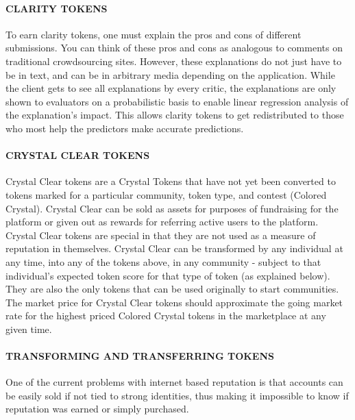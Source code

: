 \paragraph{CLARITY TOKENS}\label{clarity-tokens}

To earn clarity tokens, one must explain the pros and cons of different
submissions. You can think of these pros and cons as analogous to
comments on traditional crowdsourcing sites. However, these explanations
do not just have to be in text, and can be in arbitrary media depending
on the application. While the client gets to see all explanations by
every critic, the explanations are only shown to evaluators on a
probabilistic basis to enable linear regression analysis of the
explanation's impact. This allows clarity tokens to get redistributed to
those who most help the predictors make accurate predictions.

\paragraph{CRYSTAL CLEAR TOKENS }\label{crystal-clear-tokens}

Crystal Clear tokens are a Crystal Tokens that have not yet been
converted to tokens marked for a particular community, token type, and
contest (Colored Crystal). Crystal Clear can be sold as assets for
purposes of fundraising for the platform or given out as rewards for
referring active users to the platform. Crystal Clear tokens are special
in that they are not used as a measure of reputation in themselves.
Crystal Clear can be transformed by any individual at any time, into any
of the tokens above, in any community - subject to that individual's
expected token score for that type of token (as explained below). They
are also the only tokens that can be used originally to start
communities. The market price for Crystal Clear tokens should
approximate the going market rate for the highest priced Colored Crystal
tokens in the marketplace at any given time.

\paragraph{TRANSFORMING AND TRANSFERRING
TOKENS}\label{transforming-and-transferring-tokens}

One of the current problems with internet based reputation is that
accounts can be easily sold if not tied to strong identities, thus
making it impossible to know if reputation was earned or simply
purchased.

